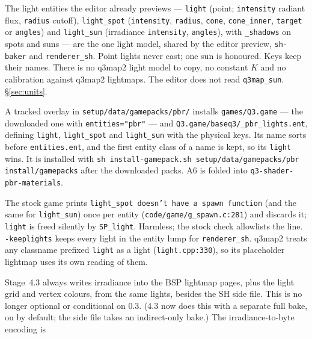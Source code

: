 \documentclass[11pt,a4paper]{article}
\begin{document}
\begin{description}[style=nextline]
\item[Lights: the editor's physical model, not q3map2's.] The light entities the editor already
  previews --- \texttt{light} (point; \texttt{intensity} radiant flux, \texttt{radius} cutoff),
  \texttt{light\_spot} (\texttt{intensity}, \texttt{radius}, \texttt{cone}, \texttt{cone\_inner},
  \texttt{target} or \texttt{angles}) and \texttt{light\_sun} (irradiance \texttt{intensity},
  \texttt{angles}), with \texttt{\_shadows} on spots and suns --- are the one light model, shared by
  the editor preview, \texttt{sh-baker} and \texttt{renderer\_sh}. Point lights never cast; one sun
  is honoured. Keys keep their names. There is no q3map2 light model to copy, no constant $K$ and
  no calibration against q3map2 lightmaps. The editor does not read \texttt{q3map\_sun}.
  §\ref{sec:units}.
\item[\texttt{Q3.game} gets the PBR entity module (A6).] A tracked overlay in
  \texttt{setup/data/gamepacks/pbr/} installs \texttt{games/Q3.game} --- the downloaded one with
  \texttt{entities="pbr"} --- and \texttt{Q3.game/baseq3/\_pbr\_lights.ent}, defining
  \texttt{light}, \texttt{light\_spot} and \texttt{light\_sun} with the physical keys. Its name
  sorts before \texttt{entities.ent}, and the first entity class of a name is kept, so its
  \texttt{light} wins. It is installed with \texttt{sh install-gamepack.sh setup/data/gamepacks/pbr
  install/gamepacks} after the downloaded packs. A6 is folded into
  \texttt{q3-shader-pbr-materials}.
\item[Vanilla compatibility of the light entities.] The stock game prints \texttt{light\_spot
  doesn't have a spawn function} (and the same for \texttt{light\_sun}) once per entity
  (\texttt{code/game/g\_spawn.c:281}) and discards it; \texttt{light} is freed silently by
  \texttt{SP\_light}. Harmless; the stock check allowlists the line. \texttt{-keeplights} keeps every
  light in the entity lump for \texttt{renderer\_sh}. q3map2 treats any classname prefixed
  \texttt{light} as a light (\texttt{light.cpp:330}), so its placeholder lightmap uses its own
  reading of them.
\item[\texttt{sh-baker} writes the vanilla lightmap.] Stage~4.3 always writes irradiance into the
  BSP lightmap pages, plus the light grid and vertex colours, from the same lights, besides the SH
  side file. This is no longer optional or conditional on 0.3. (4.3 now does this with a separate
  full bake, on by default; the side file takes an indirect-only bake.) The irradiance-to-byte encoding is

\end{description}
\end{document}
